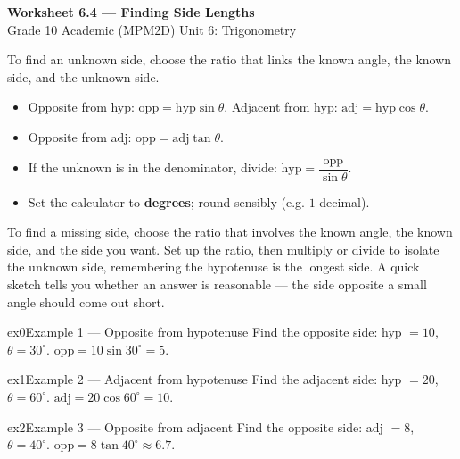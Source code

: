 \documentclass[11pt]{article}
\begin{document}
\begin{center}
{\LARGE\bfseries\color{titleblue}Worksheet 6.4 --- Finding Side Lengths}\\[2pt]
{\small Grade 10 Academic (MPM2D) \textperiodcentered{} Unit 6: Trigonometry}
\end{center}

\begin{ideabox}
To find an unknown side, choose the ratio that links the known angle, the known side, and the unknown side.
\begin{itemize}[leftmargin=*,itemsep=2pt]
  \item Opposite from hyp: $\text{opp}=\text{hyp}\sin\theta$. Adjacent from hyp: $\text{adj}=\text{hyp}\cos\theta$.
  \item Opposite from adj: $\text{opp}=\text{adj}\tan\theta$.
  \item If the unknown is in the denominator, divide: $\text{hyp}=\dfrac{\text{opp}}{\sin\theta}$.
  \item Set the calculator to \textbf{degrees}; round sensibly (e.g. $1$ decimal).
\end{itemize}
\end{ideabox}

\begin{learnbox}
To find a missing side, choose the ratio that involves the known angle, the known side, and the side you want.
Set up the ratio, then multiply or divide to isolate the unknown side, remembering the hypotenuse is the longest side.
A quick sketch tells you whether an answer is reasonable — the side opposite a small angle should come out short.
\end{learnbox}


\begin{example}{ex0}{Example 1 --- Opposite from hypotenuse}
Find the opposite side: hyp $=10$, $\theta=30^\circ$.
\soln $\text{opp}=10\sin30^\circ=5.$
\end{example}

\begin{example}{ex1}{Example 2 --- Adjacent from hypotenuse}
Find the adjacent side: hyp $=20$, $\theta=60^\circ$.
\soln $\text{adj}=20\cos60^\circ=10.$
\end{example}

\begin{example}{ex2}{Example 3 --- Opposite from adjacent}
Find the opposite side: adj $=8$, $\theta=40^\circ$.
\soln $\text{opp}=8\tan40^\circ\approx6.7.$
\end{example}
\end{document}
